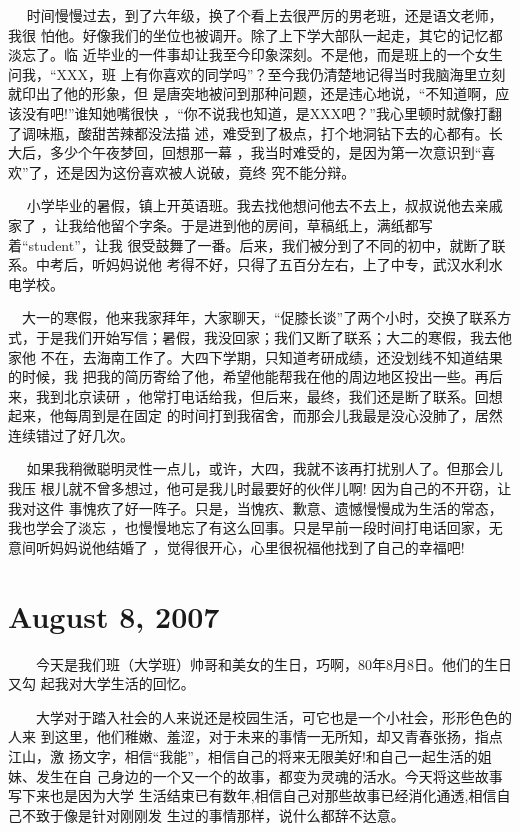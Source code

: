 \documentclass[12pt]{book}
\begin{document}
   　 时间慢慢过去，到了六年级，换了个看上去很严厉的男老班，还是语文老师，我很
怕他。好像我们的坐位也被调开。除了上下学大部队一起走，其它的记忆都淡忘了。临
近毕业的一件事却让我至今印象深刻。不是他，而是班上的一个女生问我，“XXX，班
上有你喜欢的同学吗”？至今我仍清楚地记得当时我脑海里立刻就印出了他的形象，但
是唐突地被问到那种问题，还是违心地说，“不知道啊，应该没有吧!”谁知她嘴很快
，“你不说我也知道，是XXX吧？”我心里顿时就像打翻了调味瓶，酸甜苦辣都没法描
述，难受到了极点，打个地洞钻下去的心都有。长大后，多少个午夜梦回，回想那一幕
，我当时难受的，是因为第一次意识到“喜欢”了，还是因为这份喜欢被人说破，竟终
究不能分辩。

  　 小学毕业的暑假，镇上开英语班。我去找他想问他去不去上，叔叔说他去亲戚家了
，让我给他留个字条。于是进到他的房间，草稿纸上，满纸都写着“student”，让我
很受鼓舞了一番。后来，我们被分到了不同的初中，就断了联系。中考后，听妈妈说他
考得不好，只得了五百分左右，上了中专，武汉水利水电学校。

    　大一的寒假，他来我家拜年，大家聊天，“促膝长谈”了两个小时，交换了联系方
式，于是我们开始写信；暑假，我没回家；我们又断了联系；大二的寒假，我去他家他
不在，去海南工作了。大四下学期，只知道考研成绩，还没划线不知道结果的时候，我
把我的简历寄给了他，希望他能帮我在他的周边地区投出一些。再后来，我到北京读研
，他常打电话给我，但后来，最终，我们还是断了联系。回想起来，他每周到是在固定
的时间打到我宿舍，而那会儿我最是没心没肺了，居然连续错过了好几次。

   　 如果我稍微聪明灵性一点儿，或许，大四，我就不该再打扰别人了。但那会儿我压
根儿就不曾多想过，他可是我儿时最要好的伙伴儿啊! 因为自己的不开窃，让我对这件
事愧疚了好一阵子。只是，当愧疚、歉意、遗憾慢慢成为生活的常态，我也学会了淡忘
，也慢慢地忘了有这么回事。只是早前一段时间打电话回家，无意间听妈妈说他结婚了
，觉得很开心，心里很祝福他找到了自己的幸福吧!
\section{August 8, 2007　　}
\label{sec-1-4}

　　今天是我们班（大学班）帅哥和美女的生日，巧啊，80年8月8日。他们的生日又勾
起我对大学生活的回忆。

　　大学对于踏入社会的人来说还是校园生活，可它也是一个小社会，形形色色的人来
到这里，他们稚嫩、羞涩，对于未来的事情一无所知，却又青春张扬，指点江山，激 
扬文字，相信“我能”，相信自己的将来无限美好!和自己一起生活的姐妹、发生在自
己身边的一个又一个的故事，都变为灵魂的活水。今天将这些故事写下来也是因为大学
生活结束已有数年,相信自己对那些故事已经消化通透,相信自己不致于像是针对刚刚发
生过的事情那样，说什么都辞不达意。
\end{document}
